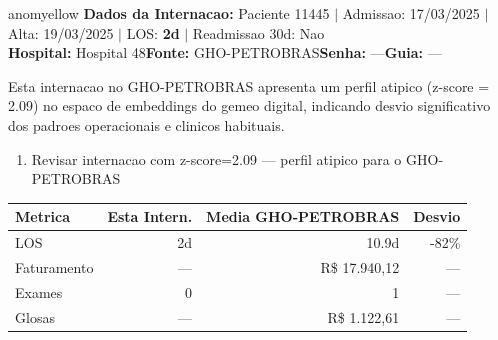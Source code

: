 \documentclass[a4paper,10pt]{article}
\begin{document}
\begin{anomalycard}[Internacao 124979 | GHO-PETROBRAS | MODERADO (z=2.09)]{anomyellow}
\textbf{Dados da Internacao:} Paciente 11445 $\mid$ Admissao: 17/03/2025 $\mid$ Alta: 19/03/2025 $\mid$ LOS: \textbf{2d} $\mid$ Readmissao 30d: Nao\\
\textbf{Hospital:} Hospital 48\quad\textbf{Fonte:} GHO-PETROBRAS\quad\textbf{Senha:} ---\quad\textbf{Guia:} ---\\
\vspace{2pt}\begin{tcolorbox}[colback=severityred!20,colframe=anomyellow,title={\textbf{Interpretacao de Negocio}},fonttitle=\bfseries\small,left=4pt,right=4pt,top=3pt,bottom=3pt]
{\small Esta internacao no GHO-PETROBRAS apresenta um perfil atipico (z-score = 2.09) no espaco de embeddings do gemeo digital, indicando desvio significativo dos padroes operacionais e clinicos habituais.}
\end{tcolorbox}
\begin{tcolorbox}[colback=severityyellow!30,colframe=anomorange,title={\textbf{Recomendacoes Especificas}},fonttitle=\bfseries\small,left=4pt,right=4pt,top=3pt,bottom=3pt]
\begin{enumerate}[nosep,leftmargin=16pt]
\item {\small Revisar internacao com z-score=2.09 --- perfil atipico para o GHO-PETROBRAS}
\end{enumerate}
\end{tcolorbox}
\begin{center}\begin{tabular}{l r r r}\toprule\textbf{Metrica} & \textbf{Esta Intern.} & \textbf{Media GHO-PETROBRAS} & \textbf{Desvio} \\\midrule
LOS & 2d & 10.9d & -82\% \\
Faturamento & --- & R\$ 17.940,12 & --- \\
Exames & 0 & 1 & --- \\
Glosas & --- & R\$ 1.122,61 & --- \\
\bottomrule\end{tabular}\end{center}


\end{anomalycard}
\end{document}
